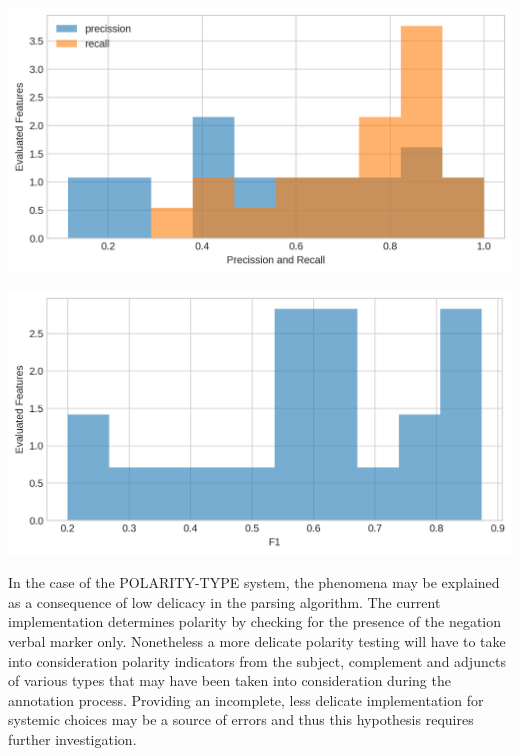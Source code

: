     \vspace{1em}
    \noindent
    \begin{minipage}[t]{0.49\textwidth}
        \centering
        \includegraphics[width=\textwidth]{evaluation-results/figures-old/accuracy-syntactic-mood-precission-recall.png}
        \label{fig:mood-precission-recall}
    \end{minipage}
    \quad
    \begin{minipage}[t]{0.49\textwidth}
        \centering
        \includegraphics[width=\textwidth]{evaluation-results/figures-old/accuracy-syntactic-mood-f1.png}
        \label{fig:mood-precission-f1}
    \end{minipage}
    \vspace{1em}
    
    In the case of the POLARITY-TYPE system, the phenomena may be explained as a consequence of low delicacy in the parsing algorithm. The current implementation determines polarity by checking for the presence of the negation verbal marker only. Nonetheless a more delicate polarity testing will have to take into consideration polarity indicators from the subject, complement and adjuncts of various types that may have been taken into consideration during the annotation process. Providing an incomplete, less delicate implementation for systemic choices may be a source of errors and thus this hypothesis requires further investigation.  %
    
